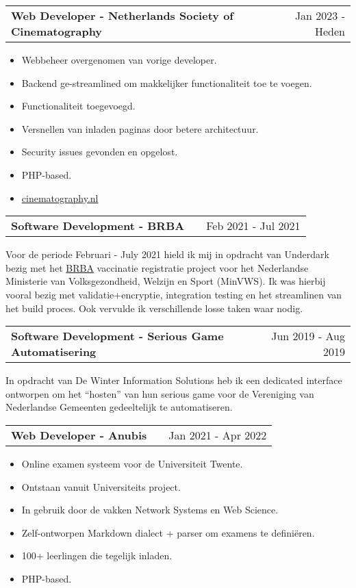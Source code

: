 \documentclass[a4paper,12pt]{article}
\makeatletter
\newenvironment{jobshort}[2]
    {
    \begin{tabularx}{\linewidth}{@{}l X r@{}}
    \textbf{#1} & \hfill &  #2 \\[3.75pt]
    \end{tabularx}
    }
    {
    }
\newenvironment{joblong}[2]
    {
    \begin{tabularx}{\linewidth}{@{}l X r@{}}
    \textbf{#1} & \hfill &  #2 \\[3.75pt]
    \end{tabularx}
    \begin{minipage}[t]{\linewidth}
    \begin{itemize}[nosep,after=\strut, leftmargin=1em, itemsep=3pt,label=--]
    }
    {
    \end{itemize}
    \end{minipage}    
    }
\makeatother
\begin{document}
\begin{joblong}{Web Developer - Netherlands Society of Cinematography}{Jan 2023 - Heden}
\item Webbeheer overgenomen van vorige developer.
\item Backend ge-streamlined om makkelijker functionaliteit toe te voegen.
\item Functionaliteit toegevoegd.
\item Versnellen van inladen paginas door betere architectuur.
\item Security issues gevonden en opgelost.
\item PHP-based.
\item \href{https://cinematography.nl}{cinematography.nl}
\end{joblong}

\begin{jobshort}{Software Development - BRBA}{Feb 2021 - Jul 2021}
Voor de periode Februari - July 2021 hield ik mij in opdracht van Underdark bezig met het \href{https://www.ronroozendaal.nl/blog/2021/05/een-nieuw-registratiesysteem-in-een-paar-weken-tijd}{BRBA} vaccinatie registratie project voor het Nederlandse Ministerie van
Volksgezondheid, Welzijn en Sport (MinVWS). Ik was hierbij vooral bezig met validatie+encryptie, integration testing en het streamlinen van het build proces. Ook vervulde ik verschillende losse taken waar nodig.
\end{jobshort}

\begin{jobshort}{Software Development - Serious Game Automatisering}{Jun 2019 - Aug 2019}
In opdracht van De Winter Information Solutions heb ik een dedicated interface ontworpen om het ``hosten'' van hun serious game voor de Vereniging van Nederlandse Gemeenten gedeeltelijk te automatiseren. 
\end{jobshort}

\begin{joblong}{Web Developer - Anubis}{Jan 2021 - Apr 2022}
\item Online examen systeem voor de Universiteit Twente.
\item Ontstaan vanuit Universiteits project.
\item In gebruik door de vakken Network Systems en Web Science.
\item Zelf-ontworpen Markdown dialect + parser om examens te definiëren. 
\item 100+ leerlingen die tegelijk inladen.
\item PHP-based.
\end{joblong}
  
\end{document}
